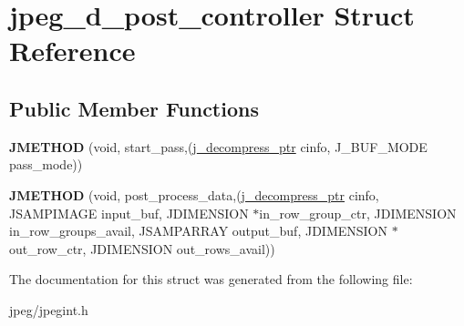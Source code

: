 \hypertarget{structjpeg__d__post__controller}{}\section{jpeg\+\_\+d\+\_\+post\+\_\+controller Struct Reference}
\label{structjpeg__d__post__controller}
\subsection*{Public Member Functions}
\begin{DoxyCompactItemize}
\item 
{\bfseries J\+M\+E\+T\+H\+OD} (void, start\+\_\+pass,(\hyperlink{structjpeg__decompress__struct}{j\+\_\+decompress\+\_\+ptr} cinfo, J\+\_\+\+B\+U\+F\+\_\+\+M\+O\+DE pass\+\_\+mode))\hypertarget{structjpeg__d__post__controller_a349b2ff7508568d13a9294f3e79163aa}{}\label{structjpeg__d__post__controller_a349b2ff7508568d13a9294f3e79163aa}

\item 
{\bfseries J\+M\+E\+T\+H\+OD} (void, post\+\_\+process\+\_\+data,(\hyperlink{structjpeg__decompress__struct}{j\+\_\+decompress\+\_\+ptr} cinfo,       J\+S\+A\+M\+P\+I\+M\+A\+GE input\+\_\+buf,       J\+D\+I\+M\+E\+N\+S\+I\+ON $\ast$in\+\_\+row\+\_\+group\+\_\+ctr,       J\+D\+I\+M\+E\+N\+S\+I\+ON in\+\_\+row\+\_\+groups\+\_\+avail,       J\+S\+A\+M\+P\+A\+R\+R\+AY output\+\_\+buf,       J\+D\+I\+M\+E\+N\+S\+I\+ON $\ast$out\+\_\+row\+\_\+ctr,       J\+D\+I\+M\+E\+N\+S\+I\+ON out\+\_\+rows\+\_\+avail))\hypertarget{structjpeg__d__post__controller_a3ad9cb427ef9236516688d716aebc8c9}{}\label{structjpeg__d__post__controller_a3ad9cb427ef9236516688d716aebc8c9}

\end{DoxyCompactItemize}


The documentation for this struct was generated from the following file\+:\begin{DoxyCompactItemize}
\item 
jpeg/jpegint.\+h\end{DoxyCompactItemize}
